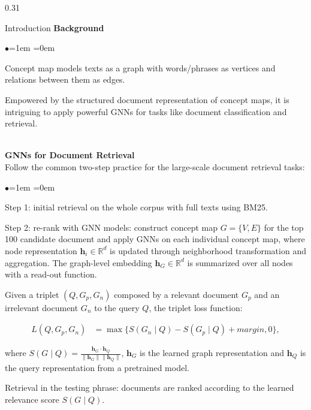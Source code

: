 \documentclass[serif,onlymath,final,xcolor=table]{beamer}
\begin{document}
\begin{frame}
\begin{columns}[t]

\begin{column}{0.31\linewidth}
\begin{block}{Introduction}
\textbf{Background}
\begin{list}{$\bullet$}{\leftmargin=1em \itemindent=0em}
\item Concept map models texts as a graph with words/phrases as vertices and relations between them as edges.
\item Empowered by the structured document representation of concept maps, it is intriguing to apply powerful GNNs for tasks like document classification and retrieval.
\end{list}

~\\
\textbf{GNNs for Document Retrieval}\\
Follow the common two-step practice for the large-scale document retrieval tasks: 
\begin{list}{$\bullet$}{\leftmargin=1em \itemindent=0em}
\item Step 1: initial retrieval on the whole corpus with full texts using BM25.
\item Step 2: re-rank with GNN models: construct concept map \(G = \{V, E\}\) for the top 100 candidate document and apply GNNs on each individual concept map, where node representation \(\bm{h}_i \in \mathbb{R}^{d}\) is updated through neighborhood transformation and aggregation. The graph-level embedding \(\bm{h}_G \in \mathbb{R}^{d}\) is summarized over all nodes with a read-out function. 
\item Given a triplet $(Q, G_p, G_n)$ composed by a relevant document $G_p$ and an irrelevant document $G_n$ to the query $Q$, the triplet loss function:
\begin{small}
\begin{align*}
L(Q, G_p, G_n)&=\max \{ S(G_n \mid Q) - S(G_p \mid Q)+\textit{margin}, 0\},
\end{align*}
\end{small}
where $S \left(G \mid Q \right)= \frac{\bm{h}_G \cdot \bm{h}_Q}{\|\bm{h}_G \|\|\bm{h}_Q\|}$, $\bm h_G$ is the learned graph representation and $\bm h_Q$ is the query representation from a pretrained model.
\item Retrieval in the testing phrase: documents are ranked according to the learned relevance score $S(G \mid Q)$.
\end{list}
\end{block}


\end{column}
\end{columns}
\end{frame}
\end{document}
